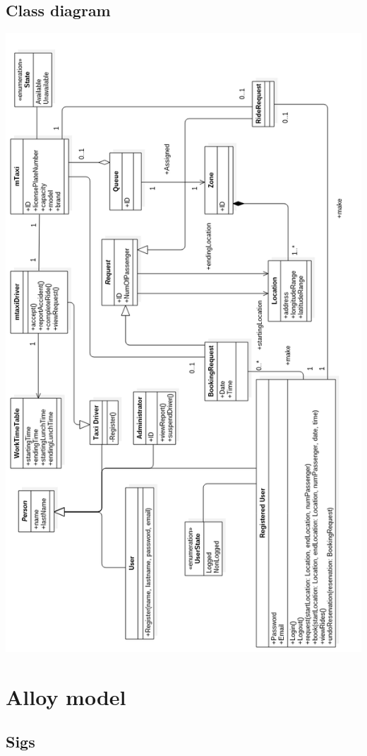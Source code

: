 \documentclass[11pt,titlepage]{article} %
\begin{document}
	\subsection{Class diagram}
	\includegraphics[scale=0.55]{classdiagram.png}

	\section{Alloy model}

	\subsection{Sigs}
		
	\newpage
\end{document}
